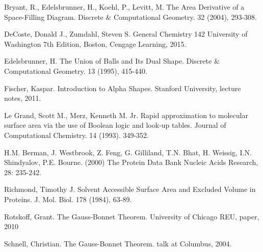 \documentclass{article}
\begin{document}
\listoffigures

\begin{thebibliography}{9}

Bryant, R., Edelsbrunner, H., Koehl, P., Levitt, M. The Area Derivative of a Space-Filling Diagram. Discrete \& Computational Geometry. 32 (2004), 293-308.

DeCoste, Donald J., Zumdahl, Steven S. General Chemistry 142 University of Washington 7th Edition, Boston, Cengage Learning, 2015.

Edelsbrunner, H. The Union of Balls and Its Dual Shape. Discrete \& Computational Geometry. 13 (1995), 415-440.

Fischer, Kaspar. Introduction to Alpha Shapes. Stanford University, lecture notes, 2011.

Le Grand, Scott M., Merz, Kenneth M. Jr. Rapid approximation to molecular surface area via the use of Boolean logic and look-up tables. Journal of Computational Chemistry. 14 (1993). 349-352.

H.M. Berman, J. Westbrook, Z. Feng, G. Gilliland, T.N. Bhat, H. Weissig, I.N. Shindyalov, P.E. Bourne.
(2000) The Protein Data Bank Nucleic Acids Research, 28: 235-242.

Richmond, Timothy J. Solvent Accessible Surface Area and Excluded Volume in Proteins. J. Mol. Biol. 178 (1984), 63-89.

Rotskoff, Grant. The Gauss-Bonnet Theorem. University of Chicago REU, paper, 2010

Schnell, Christian. The Gauss-Bonnet Theorem. talk at Columbus, 2004.

\end{thebibliography}
\end{document}
